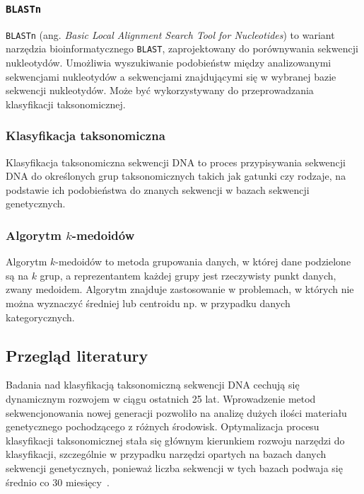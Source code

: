        \subsubsection{\texttt{BLASTn}}

            \texttt{BLASTn} (ang. \textit{Basic Local Alignment Search Tool for Nucleotides}) to wariant narzędzia bioinformatycznego \texttt{BLAST}, zaprojektowany do porównywania sekwencji nukleotydów. Umożliwia wyszukiwanie podobieństw między analizowanymi sekwencjami nukleotydów a sekwencjami znajdującymi się w wybranej bazie sekwencji nukleotydów. Może być wykorzystywany do przeprowadzania klasyfikacji taksonomicznej.

        \subsubsection{Klasyfikacja taksonomiczna}

            Klasyfikacja taksonomiczna sekwencji DNA to proces przypisywania sekwencji DNA do określonych grup taksonomicznych takich jak gatunki czy rodzaje, na podstawie ich podobieństwa do znanych sekwencji w bazach sekwencji genetycznych.

        \subsubsection{Algorytm $k$-medoidów}

            Algorytm $k$-medoidów to metoda grupowania danych, w której dane podzielone są na $k$ grup, a reprezentantem każdej grupy jest rzeczywisty punkt danych, zwany medoidem. Algorytm znajduje zastosowanie w problemach, w których nie można wyznaczyć średniej lub centroidu np. w przypadku danych kategorycznych.

    \subsection{Przegląd literatury}

        Badania nad klasyfikacją taksonomiczną sekwencji DNA cechują się dynamicznym rozwojem w ciągu ostatnich 25 lat. Wprowadzenie metod sekwencjonowania nowej generacji pozwoliło na analizę dużych ilości materiału genetycznego pochodzącego z różnych środowisk. Optymalizacja procesu klasyfikacji taksonomicznej stała się głównym kierunkiem rozwoju narzędzi do klasyfikacji, szczególnie w przypadku narzędzi opartych na bazach danych sekwencji genetycznych, ponieważ liczba sekwencji w tych bazach podwaja się średnio co 30 miesięcy~\cite{Benson:2008}.

